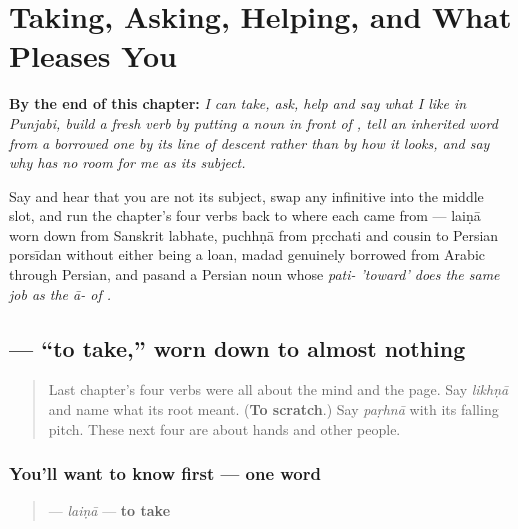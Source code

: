 
\chapter{Taking, Asking, Helping, and What Pleases You}
\label{ch:pa-taking-and-liking}

\begin{chapteropening}
\textbf{By the end of this chapter:} \emph{I can take, ask, help and say what I like in Punjabi, build a fresh verb by putting a noun in front of , tell an inherited word from a borrowed one by its line of descent rather than by how it looks, and say why     has no room for me as its subject.}

Say     and hear that you are not its subject, swap any infinitive into the middle slot, and run the chapter's four verbs back to where each came from — laiṇā worn down from Sanskrit labhate, puchhṇā from pṛcchati and cousin to Persian porsīdan without either being a loan, madad genuinely borrowed from Arabic through Persian, and pasand a Persian noun whose \emph{pati- 'toward' does the same job as the ā- of .}
\end{chapteropening}

\section[\texorpdfstring{\pa{ਲੈਣਾ} (laiṇā)}{ਲੈਣਾ (laiṇā)}]{ — “to take,” worn down to almost nothing}

\label{lesson:PA-C09-laina}



\begin{quote}
Last chapter's four verbs were all about the mind and the page. Say \emph{likhṇā} and name what its root meant. (\textbf{To scratch}.) Say \emph{paṛhnā} with its falling pitch. These next four are about hands and other people.
\end{quote}

\subsection*{You'll want to know first — one word}
\begin{quote}
\textbf{} — \emph{laiṇā} — \textbf{to take}
\end{quote}

